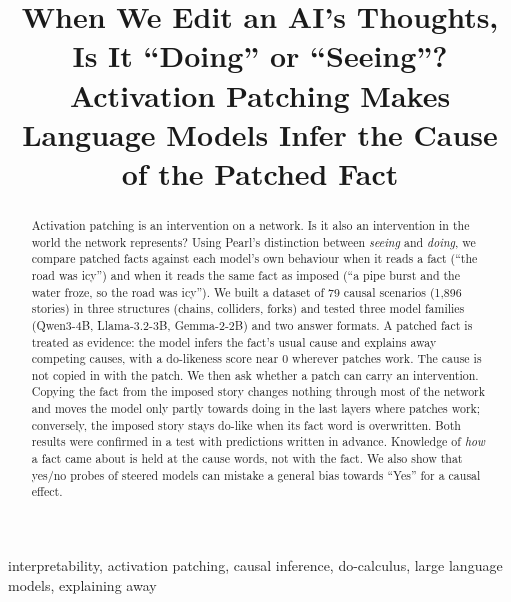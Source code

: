 \documentclass[conference]{IEEEtran}
\begin{document}
\title{When We Edit an AI's Thoughts, Is It ``Doing'' or ``Seeing''?\\
\large Activation Patching Makes Language Models Infer the Cause of the Patched Fact}

\author{
}

\maketitle

\begin{abstract}
Activation patching is an intervention on a network. Is it also an intervention in the world the network represents? Using Pearl's distinction between \emph{seeing} and \emph{doing}, we compare patched facts against each model's own behaviour when it reads a fact (``the road was icy'') and when it reads the same fact as imposed (``a pipe burst and the water froze, so the road was icy''). We built a dataset of 79 causal scenarios (1{,}896 stories) in three structures (chains, colliders, forks) and tested three model families (Qwen3-4B, Llama-3.2-3B, Gemma-2-2B) and two answer formats. A patched fact is treated as evidence: the model infers the fact's usual cause and explains away competing causes, with a do-likeness score near 0 wherever patches work. The cause is not copied in with the patch. We then ask whether a patch can carry an intervention. Copying the fact from the imposed story changes nothing through most of the network and moves the model only partly towards doing in the last layers where patches work; conversely, the imposed story stays do-like when its fact word is overwritten. Both results were confirmed in a test with predictions written in advance. Knowledge of \emph{how} a fact came about is held at the cause words, not with the fact. We also show that yes/no probes of steered models can mistake a general bias towards ``Yes'' for a causal effect.
\end{abstract}

\begin{IEEEkeywords}
interpretability, activation patching, causal inference, do-calculus, large language models, explaining away
\end{IEEEkeywords}
\end{document}
